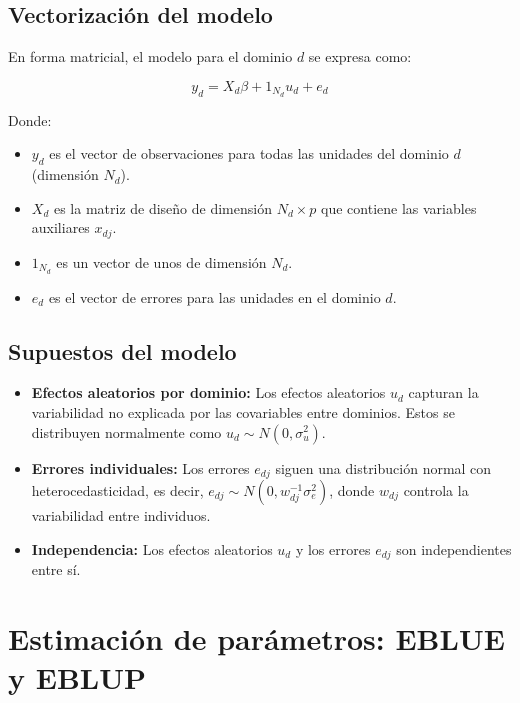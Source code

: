 \documentclass[12pt,spanish]{article}
\begin{document}
\subsection*{Vectorización del modelo}

En forma matricial, el modelo para el dominio $d$ se expresa como:

\[
y_d = X_d \beta + 1_{N_d} u_d + e_d
\]

Donde:
\begin{itemize}
    \item $y_d$ es el vector de observaciones para todas las unidades del dominio $d$ (dimensión $N_d$).
    \item $X_d$ es la matriz de diseño de dimensión $N_d \times p$ que contiene las variables auxiliares $x_{dj}$.
    \item $1_{N_d}$ es un vector de unos de dimensión $N_d$.
    \item $e_d$ es el vector de errores para las unidades en el dominio $d$.
\end{itemize}

\subsection*{Supuestos del modelo}

\begin{itemize}
    \item \textbf{Efectos aleatorios por dominio:} Los efectos aleatorios $u_d$ capturan la variabilidad no explicada por las covariables entre dominios. Estos se distribuyen normalmente como $u_d \sim N(0, \sigma_u^2)$.
    \item \textbf{Errores individuales:} Los errores $e_{dj}$ siguen una distribución normal con heterocedasticidad, es decir, $e_{dj} \sim N(0, w_{dj}^{-1} \sigma_e^2)$, donde $w_{dj}$ controla la variabilidad entre individuos.
    \item \textbf{Independencia:} Los efectos aleatorios $u_d$ y los errores $e_{dj}$ son independientes entre sí.
\end{itemize}

\section*{Estimación de parámetros: EBLUE y EBLUP}
\end{document}
